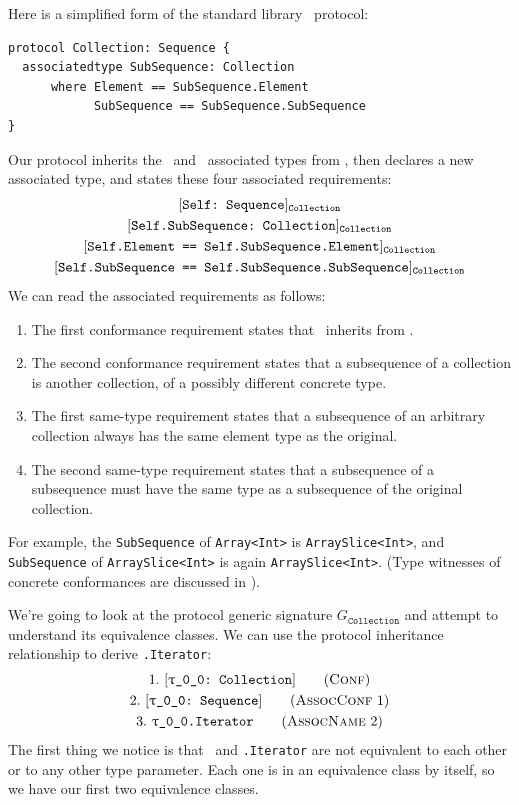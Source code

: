 \documentclass[../generics]{subfiles}
\begin{document}
\begin{example}\label{protocol collection example}
Here is a simplified form of the standard library \tCollection\ protocol:
\begin{Verbatim}
protocol Collection: Sequence {
  associatedtype SubSequence: Collection
      where Element == SubSequence.Element
            SubSequence == SubSequence.SubSequence
}
\end{Verbatim}
Our protocol inherits the \nElement\ and \nIterator\ associated types from \tSequence, then declares a new associated type, and states these four associated requirements:
\begin{gather*}
\AssocConfReq{Self}{Sequence}{Collection}\\
\AssocConfReq{Self.SubSequence}{Collection}{Collection}\\
\AssocSameReq{Self.Element}{Self.SubSequence.Element}{Collection}\\
\AssocSameReq{Self.SubSequence}{Self.SubSequence.SubSequence}{Collection}
\end{gather*}
We can read the associated requirements as follows:
\begin{enumerate}
\item The first conformance requirement states that \tCollection\ inherits from \tSequence.
\item The second conformance requirement states that a subsequence of a collection is another collection, of a possibly different concrete type.
\item The first same-type requirement states that a subsequence of an arbitrary collection always has the same element type as the original.
\item The second same-type requirement states that a subsequence of a subsequence must have the same type as a subsequence of the original collection.
\end{enumerate}
For example, the \texttt{SubSequence} of \texttt{Array<Int>} is \texttt{ArraySlice<Int>}, and \texttt{SubSequence} of \texttt{ArraySlice<Int>} is again \texttt{ArraySlice<Int>}. (Type witnesses of concrete conformances are discussed in ).

We're going to look at the protocol generic signature $G_\texttt{Collection}$ and attempt to understand its equivalence classes. We can use the protocol inheritance relationship to derive \texttt{\rT.Iterator}:
\begin{gather*}
\ConfStep{\rT}{Collection}{1}\\
\AssocConfStep{1}{\rT}{Sequence}{2}\\
\AssocNameStep{2}{\rT.Iterator}{3}
\end{gather*}
The first thing we notice is that \rT\ and \texttt{\rT.Iterator} are not equivalent to each other or to any other type parameter. Each one is in an equivalence class by itself, so we have our first two equivalence classes.


\end{example}
\end{document}
